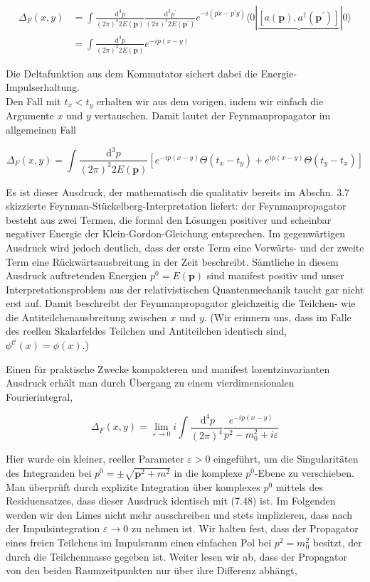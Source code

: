 \documentclass[10pt, letterpaper]{article}
\begin{document}
$$
\begin{aligned}
\Delta_{F}(x, y) & =\int \frac{\mathrm{d}^{3} p}{(2 \pi)^{3} 2 E(\mathbf{p})} \frac{\mathrm{d}^{3} p^{\prime}}{(2 \pi)^{3} 2 E\left(\mathbf{p}^{\prime}\right)} e^{-i\left(p x-p^{\prime} y\right)}\langle 0| \underbrace{\left[a(\mathbf{p}), a^{\dagger}\left(\mathbf{p}^{\prime}\right)\right]}|0\rangle \\
& =\int \frac{\mathrm{d}^{3} p}{(2 \pi)^{3} 2 E(\mathbf{p})} e^{-i p(x-y)}
\end{aligned}
$$

Die Deltafunktion aus dem Kommutator sichert dabei die Energie-Impulserhaltung.\\
Den Fall mit $t_{x}<t_{y}$ erhalten wir aus dem vorigen, indem wir einfach die Argumente $x$ und $y$ vertauschen. Damit lautet der Feynmanpropagator im allgemeinen Fall

$$
\Delta_{F}(x, y)=\int \frac{\mathrm{d}^{3} p}{(2 \pi)^{3} 2 E(\mathbf{p})}\left[e^{-i p(x-y)} \Theta\left(t_{x}-t_{y}\right)+e^{i p(x-y)} \Theta\left(t_{y}-t_{x}\right)\right]
$$

Es ist dieser Ausdruck, der mathematisch die qualitativ bereits im Abschn. 3.7 skizzierte Feynman-Stückelberg-Interpretation liefert: der Feynmanpropagator besteht aus zwei Termen, die formal den Lösungen positiver und scheinbar negativer Energie der Klein-Gordon-Gleichung entsprechen. Im gegenwärtigen Ausdruck wird jedoch deutlich, dass der erste Term eine Vorwärts- und der zweite Term eine Rückwärtsausbreitung in der Zeit beschreibt. Sämtliche in diesem Ausdruck auftretenden Energien $p^{0}=E(\mathbf{p})$ sind manifest positiv und unser Interpretationsproblem aus der relativistischen Quantenmechanik taucht gar nicht erst auf. Damit beschreibt der Feynmanpropagator gleichzeitig die Teilchen- wie die Antiteilchenausbreitung zwischen $x$ und $y$. (Wir erinnern uns, dass im Falle des reellen Skalarfeldes Teilchen und Antiteilchen identisch sind, $\phi^{\mathcal{C}}(x)=\phi(x)$.)

Einen für praktische Zwecke kompakteren und manifest lorentzinvarianten Ausdruck erhält man durch Übergang zu einem vierdimensionalen Fourierintegral,

$$
\Delta_{F}(x, y)=\lim _{\varepsilon \rightarrow 0} i \int \frac{\mathrm{~d}^{4} p}{(2 \pi)^{4}} \frac{e^{-i p(x-y)}}{p^{2}-m_{0}^{2}+i \varepsilon}
$$

Hier wurde ein kleiner, reeller Parameter $\varepsilon>0$ eingeführt, um die Singularitäten des Integranden bei $p^{0}= \pm \sqrt{\mathbf{p}^{2}+m^{2}}$ in die komplexe $p^{0}$-Ebene zu verschieben. Man überprüft durch explizite Integration über komplexes $p^{0}$ mittels des Residuensatzes, dass dieser Ausdruck identisch mit (7.48) ist. Im Folgenden werden wir den Limes nicht mehr ausschreiben und stets implizieren, dass nach der Impulsintegration $\varepsilon \rightarrow 0$ zu nehmen ist. Wir halten fest, dass der Propagator eines freien Teilchens im Impulsraum einen einfachen Pol bei $p^{2}=m_{0}^{2}$ besitzt, der durch die Teilchenmasse gegeben ist. Weiter lesen wir ab, dass der Propagator von den beiden Raumzeitpunkten nur über ihre Differenz abhängt,
\end{document}
